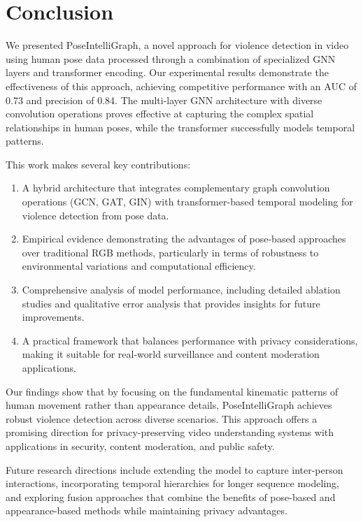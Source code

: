 \documentclass[conference]{IEEEtran}
\begin{document}
\section{Conclusion}
We presented PoseIntelliGraph, a novel approach for violence detection in video using human pose data processed through a combination of specialized GNN layers and transformer encoding. Our experimental results demonstrate the effectiveness of this approach, achieving competitive performance with an AUC of 0.73 and precision of 0.84. The multi-layer GNN architecture with diverse convolution operations proves effective at capturing the complex spatial relationships in human poses, while the transformer successfully models temporal patterns.

This work makes several key contributions:

\begin{enumerate}
    \item A hybrid architecture that integrates complementary graph convolution operations (GCN, GAT, GIN) with transformer-based temporal modeling for violence detection from pose data.

    \item Empirical evidence demonstrating the advantages of pose-based approaches over traditional RGB methods, particularly in terms of robustness to environmental variations and computational efficiency.

    \item Comprehensive analysis of model performance, including detailed ablation studies and qualitative error analysis that provides insights for future improvements.

    \item A practical framework that balances performance with privacy considerations, making it suitable for real-world surveillance and content moderation applications.
\end{enumerate}

Our findings show that by focusing on the fundamental kinematic patterns of human movement rather than appearance details, PoseIntelliGraph achieves robust violence detection across diverse scenarios. This approach offers a promising direction for privacy-preserving video understanding systems with applications in security, content moderation, and public safety.

Future research directions include extending the model to capture inter-person interactions, incorporating temporal hierarchies for longer sequence modeling, and exploring fusion approaches that combine the benefits of pose-based and appearance-based methods while maintaining privacy advantages.



\end{document}
